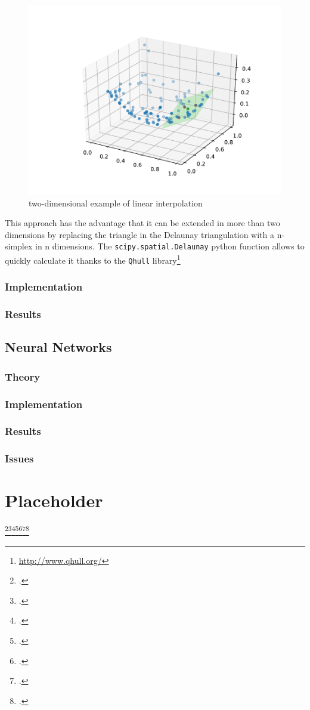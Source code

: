\begin{figure}[h] %
	\centering
	\includegraphics[width=0.8\linewidth]{images/vis2d3.pdf}
	\caption{two-dimensional example of linear interpolation}
	\label{fig:3dinterpolate-3}
\end{figure}

This approach has the advantage that it can be extended in more than two dimensions by replacing the triangle in the Delaunay triangulation with a n-simplex in n dimensions. The \texttt{scipy.spatial.Delaunay} python function allows to quickly calculate it thanks to the \texttt{Qhull} library\footnote{\url{http://www.qhull.org/}}

\subsection{Implementation}

\subsection{Results}

\section{Neural Networks}

\subsection{Theory}

\subsection{Implementation}

\subsection{Results}

\subsection{Issues}

\appendix
\chapter{Placeholder}

\lipsum[1]\footcite{Schaefer2016}\footcite{dvorakMoon}\footcite{MaindlSummary}\footcite{Burger2018}\footcite{Dorninger}\footcite{CollisionParameters}\footcite{CollisionTypes}

\printbibliography




